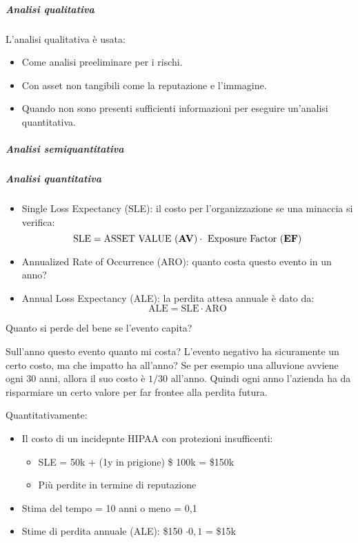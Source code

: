 \subparagraph*{Analisi qualitativa}

L'analisi qualitativa è usata:
\begin{itemize}
\item Come analisi preeliminare per i rischi.
\item Con asset non tangibili come la reputazione e l'immagine.
\item Quando non sono presenti sufficienti informazioni per eseguire un'analisi quantitativa.
\end{itemize}



\subparagraph*{Analisi semiquantitativa}



\subparagraph*{Analisi quantitativa}

\begin{itemize}
\item Single Loss Expectancy (SLE): il costo per l'organizzazione se una
minaccia si verifica:
$$
\text{SLE} = \text{ASSET VALUE (\textbf{AV})} \cdot \text{ Exposure Factor (\textbf{EF})}
$$
\item Annualized Rate of Occurrence (ARO): quanto costa questo evento in un
anno?
\item Annual Loss Expectancy (ALE): la perdita attesa annuale è dato da: 
$$
\text{ALE} = \text{SLE} \cdot \text{ARO}
$$
\end{itemize}


Quanto si perde del bene se l'evento capita?

Sull'anno questo evento quanto mi costa? L'evento negativo ha sicuramente un
certo costo, ma che impatto ha all'anno? Se per esempio una alluvione avviene
ogni 30 anni, allora il suo costo è $1/30$ all'anno. Quindi ogni anno l'azienda
ha da risparmiare un certo valore per far frontee alla perdita futura.



Quantitativamente:
\begin{itemize}
\item Il costo di un incidepnte HIPAA con protezioni insufficenti:
\begin{itemize}
 \item SLE = 50k + (1y in prigione) \$ 100k = \$150k
 \item Più perdite in termine di reputazione
\end{itemize}
\item Stima del tempo = 10 anni o meno = 0,1
\item Stime di perdita annuale (ALE): \$150 $\cdot 0,1$ = \$15k
\end{itemize}

